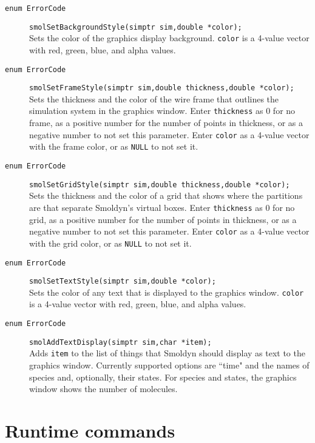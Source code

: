 \documentclass {book}
\begin{document}
\begin{description}
\item[\texttt{enum ErrorCode}]
\texttt{smolSetBackgroundStyle(simptr sim,double *color);}
\hfill \\
Sets the color of the graphics display background. \texttt{color} is a 4-value vector with red, green, blue, and alpha values.

\item[\texttt{enum ErrorCode}]
\texttt{smolSetFrameStyle(simptr sim,double thickness,double *color);}
\hfill \\
Sets the thickness and the color of the wire frame that outlines the simulation system in the graphics window. Enter \texttt{thickness} as 0 for no frame, as a positive number for the number of points in thickness, or as a negative number to not set this parameter. Enter \texttt{color} as a 4-value vector with the frame color, or as \texttt{NULL} to not set it.

\item[\texttt{enum ErrorCode}]
\texttt{smolSetGridStyle(simptr sim,double thickness,double *color);}
\hfill \\
Sets the thickness and the color of a grid that shows where the partitions are that separate Smoldyn's virtual boxes. Enter \texttt{thickness} as 0 for no grid, as a positive number for the number of points in thickness, or as a negative number to not set this parameter. Enter \texttt{color} as a 4-value vector with the grid color, or as \texttt{NULL} to not set it.

\item[\texttt{enum ErrorCode}]
\texttt{smolSetTextStyle(simptr sim,double *color);}
\hfill \\
Sets the color of any text that is displayed to the graphics window. \texttt{color} is a 4-value vector with red, green, blue, and alpha values.

\item[\texttt{enum ErrorCode}]
\texttt{smolAddTextDisplay(simptr sim,char *item);}
\hfill \\
Adds \texttt{item} to the list of things that Smoldyn should display as text to the graphics window. Currently supported options are ``time" and the names of species and, optionally, their states. For species and states, the graphics window shows the number of molecules.

\end{description}

\section{Runtime commands}
\end{document}
